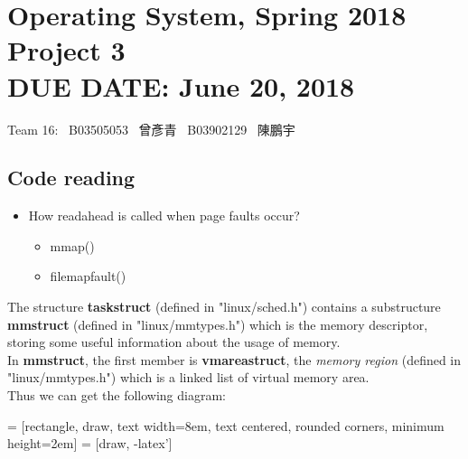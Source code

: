 \documentclass{article}
\renewcommand{\_}{\textscale{.5}{\textunderscore}}
\newcommand{\hmwkClass}{Operating System, Spring 2018}
\newcommand{\hmwkTitle}{Project 3}
\newcommand{\hmwkDueDate}{June 20, 2018}
\newcommand{\tb}{\textbf}
\begin{document}
\thispagestyle{empty}
\section*{\hmwkClass \\
    \normalsize{\hmwkTitle} \\
    \normalsize{DUE DATE: \hmwkDueDate}
}

\hfill{Team 16: \, B03505053 \, 曾彥青 \, B03902129 \, 陳鵬宇} \\

\subsection*{Code reading}

\begin{itemize}
    \item How readahead is called when page faults occur?
    \begin{itemize}
        \item mmap()
        \item filemap\_fault()
    \end{itemize}
\end{itemize}

The structure \tb{task\_struct} (defined in "linux/sched.h") contains a substructure \tb{mm\_struct} (defined in "linux/mm\_types.h") which is the memory descriptor, storing some useful information about the usage of memory. \\

In \tb{mm\_struct}, the first member is \tb{vm\_area\_struct}, the \textsl{memory region} (defined in "linux/mm\_types.h") which is a linked list of virtual memory area. \\

Thus we can get the following diagram:

 = [rectangle, draw, text width=8em, text centered, rounded corners, minimum height=2em]
 = [draw, -latex']
\begin{center}
\end{center}
\end{document}
